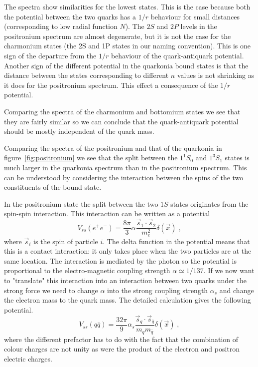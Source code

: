 \documentclass[12pt]{article}
\begin{document}
The spectra show similarities for the lowest states. This is the case because both the potential between the two quarks has a $1/r$ behaviour for small distances (corresponding to low radial function $N$). The $2S$ and $2P$ levels in the positronium spectrum are almost degenerate, but it is not the case for the charmonium states (the 2S and 1P states in our naming convention). This is one sign of the departure from the $1/r$ behaviour of the quark-antiquark potential. Another sign of the different potential in the quarkonia bound states is that the distance between the states corresponding to different $n$ values is not shrinking as it does for the positronium spectrum. This effect a consequence of the $1/r$ potential.      
 
Comparing the spectra of the charmonium and bottomium states we see that they are fairly similar so we can conclude that the quark-antiquark potential should be mostly independent of the quark mass. 

Comparing the spectra of the positronium and that of the quarkonia in figure~\ref{fig:positronium} we see that the split between the $1^{1}S_0$ and $1^3S_1$ states is much larger in the quarkonia spectrum than in the positronium spectrum. This can be understood by considering the interaction between the spins of the two constituents of the bound state.

In the positronium state the split between the two $1S$ states originates from the spin-spin interaction. This interaction can be written as a potential
\[V_{ss}(e^+e^-)=\frac{8\pi}{3}\alpha \frac{\vec s_1\cdot\vec s_2}{m_e^2}\delta(\vec x)\;,\]
where $\vec s_i$ is the spin of particle $i$. The delta function in the potential means that this is a contact interaction: it only takes place when the two particles are at the same location. The interaction is mediated by the photon so the potential is proportional to the electro-magnetic coupling strength $\alpha\simeq1/137$. If we now want to "translate" this interaction into an interaction between two quarks under the strong force we need to change $\alpha$ into the strong coupling strength $\alpha_s$ and change the electron mass to the quark mass. The detailed calculation gives the following potential.
\[V_{ss}(q\bar q)=\frac{32\pi}{9}\alpha_s \frac{\vec s_q\cdot\vec s_{\bar{q}}}{m_q m_{\bar q}}\delta(\vec x)\;,\]    
where the different prefactor has to do with the fact that the combination of colour charges are not unity as were the product of the electron and positron electric charges. 
\end{document}
